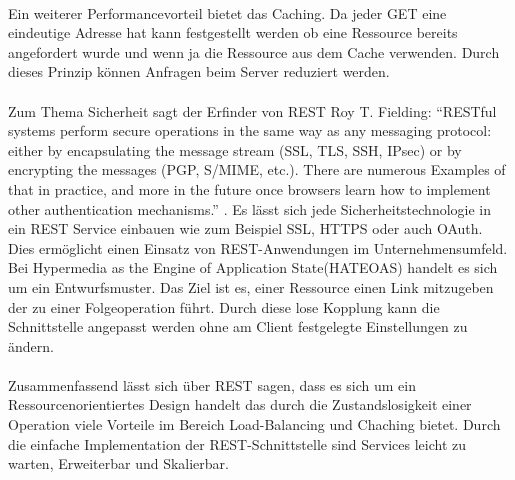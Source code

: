 \paragraph{}
Ein weiterer Performancevorteil bietet das Caching. Da jeder GET eine eindeutige Adresse hat kann festgestellt werden ob eine Ressource bereits angefordert wurde und wenn ja die  Ressource aus dem Cache verwenden. Durch dieses Prinzip können Anfragen beim Server reduziert werden.
\paragraph{}
Zum Thema Sicherheit sagt der Erfinder von REST Roy T. Fielding: "`RESTful systems perform secure operations in the same way as any messaging protocol: either by encapsulating the message stream (SSL, TLS, SSH, IPsec) or by encrypting the messages (PGP, S/MIME, etc.). There are numerous Examples of that in practice, and more in the future once browsers learn how to implement other authentication mechanisms."' \cite{fielding2008restapi}. Es lässt sich jede Sicherheitstechnologie in ein REST Service einbauen wie zum Beispiel  \ac{SSL}, \ac{HTTPS} oder auch OAuth. Dies ermöglicht einen Einsatz von REST-Anwendungen im Unternehmensumfeld.
Bei Hypermedia as the Engine of Application State(\ac{HATEOAS}) handelt es sich um ein Entwurfsmuster. Das Ziel ist es, einer Ressource einen Link mitzugeben der zu einer Folgeoperation führt. Durch diese lose Kopplung kann die Schnittstelle angepasst werden ohne am Client festgelegte Einstellungen zu ändern.
\paragraph{}
Zusammenfassend lässt sich über \ac{REST} sagen, dass es sich um ein Ressourcenorientiertes Design handelt das durch die Zustandslosigkeit einer Operation viele Vorteile im Bereich Load-Balancing und Chaching  bietet. Durch die einfache Implementation der REST-Schnittstelle sind Services leicht zu warten,  Erweiterbar und Skalierbar. 